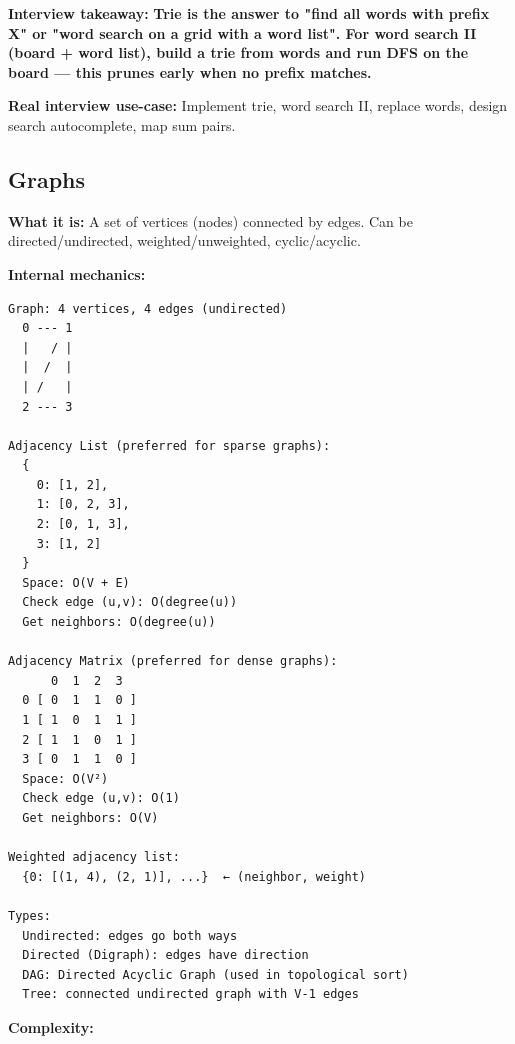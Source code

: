 \documentclass[11pt]{article}
\begin{document}
\textbf{Interview takeaway:} \textbf{Trie is the answer to "find all words with prefix X" or "word search on a grid with a word list". For word search II (board + word list), build a trie from words and run DFS on the board --- this prunes early when no prefix matches.}

\textbf{Real interview use-case:} Implement trie, word search II, replace words, design search autocomplete, map sum pairs.

\subsection{Graphs}\label{graphs}

\textbf{What it is:} A set of vertices (nodes) connected by edges. Can be directed/undirected, weighted/unweighted, cyclic/acyclic.

\textbf{Internal mechanics:}

\setcodelang{}

\begin{verbatim}
Graph: 4 vertices, 4 edges (undirected)
  0 --- 1
  |   / |
  |  /  |
  | /   |
  2 --- 3

Adjacency List (preferred for sparse graphs):
  {
    0: [1, 2],
    1: [0, 2, 3],
    2: [0, 1, 3],
    3: [1, 2]
  }
  Space: O(V + E)
  Check edge (u,v): O(degree(u))
  Get neighbors: O(degree(u))

Adjacency Matrix (preferred for dense graphs):
      0  1  2  3
  0 [ 0  1  1  0 ]
  1 [ 1  0  1  1 ]
  2 [ 1  1  0  1 ]
  3 [ 0  1  1  0 ]
  Space: O(V²)
  Check edge (u,v): O(1)
  Get neighbors: O(V)

Weighted adjacency list:
  {0: [(1, 4), (2, 1)], ...}  ← (neighbor, weight)

Types:
  Undirected: edges go both ways
  Directed (Digraph): edges have direction
  DAG: Directed Acyclic Graph (used in topological sort)
  Tree: connected undirected graph with V-1 edges
\end{verbatim}

\textbf{Complexity:}
\end{document}
